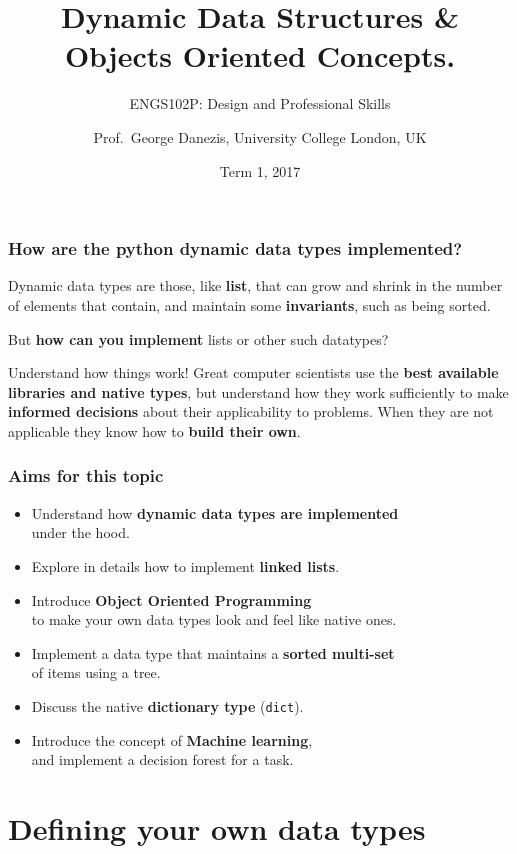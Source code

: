 \documentclass{beamer} %
\author{Prof.\ George Danezis, University College London, UK}
\title{Dynamic Data Structures \& Objects Oriented Concepts.}
\subtitle{ENGS102P: Design and Professional Skills }
\date{Term 1, 2017}
\newcommand\emc[1]{\textcolor{brightblue}{\textbf{#1}}}
\begin{document}
\nobibliography*


\frame{
\titlepage
}

\begin{frame}
\frametitle{How are the python dynamic data types implemented?}

Dynamic data types are those, like \emc{list}, that can grow and shrink in the number of elements that contain, and maintain some \emc{invariants}, such as being sorted.

\vspace{3mm}
But \emc{how can you implement} lists or other such datatypes?

\vspace{3mm}
\begin{block}{Understand how things work!}
Great computer scientists use the \emc{best available libraries and native types}, but understand how they work sufficiently to make \emc{informed decisions} about their applicability to problems. When they are not applicable they know how to \emc{build their own}.
\end{block}

\end{frame}

\begin{frame}
\frametitle{Aims for this topic}

\begin{itemize}
	\item Understand how \emc{dynamic data types are implemented} \\ under the hood.
	\item Explore in details how to implement \emc{linked lists}.
	\item Introduce \emc{Object Oriented Programming} \\ to make your own data types look and feel like native ones.
	\item Implement a data type that maintains a \emc{sorted multi-set} \\ of items using a tree.
	\item Discuss the native \emc{dictionary type} (\texttt{dict}).
	\item Introduce the concept of \emc{Machine learning}, \\ and implement a decision forest for a task.
\end{itemize}

\end{frame}


\section{Defining your own data types}
\end{document}
